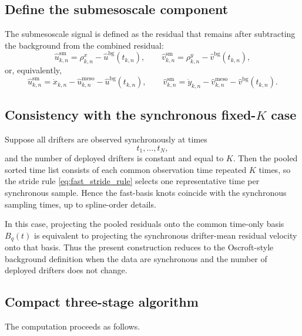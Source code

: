 \subsection{Define the submesoscale component}

The submesoscale signal is defined as the residual that remains after subtracting the
background from the combined residual:
\begin{equation}
\hat{u}^{\mathrm{sm}}_{k,n}
=
\rho^x_{k,n}-\hat{u}^{\mathrm{bg}}(t_{k,n}),
\qquad
\hat{v}^{\mathrm{sm}}_{k,n}
=
\rho^y_{k,n}-\hat{v}^{\mathrm{bg}}(t_{k,n}),
\label{eq:submeso_final}
\end{equation}
or, equivalently,
\begin{equation}
\hat{u}^{\mathrm{sm}}_{k,n}
=
\dot{x}_{k,n}
-\hat{u}^{\mathrm{meso}}_{k,n}
-\hat{u}^{\mathrm{bg}}(t_{k,n}),
\qquad
\hat{v}^{\mathrm{sm}}_{k,n}
=
\dot{y}_{k,n}
-\hat{v}^{\mathrm{meso}}_{k,n}
-\hat{v}^{\mathrm{bg}}(t_{k,n}).
\end{equation}

\subsection{Consistency with the synchronous fixed-$K$ case}

Suppose all drifters are observed synchronously at times
\begin{equation}
t_1,\dots,t_N,
\end{equation}
and the number of deployed drifters is constant and equal to $K$. Then the pooled sorted
time list consists of each common observation time repeated $K$ times, so the stride rule
\eqref{eq:fast_stride_rule} selects one representative time per synchronous sample. Hence the
fast-basis knots coincide with the synchronous sampling times, up to spline-order details.

In this case, projecting the pooled residuals onto the common time-only basis $B_q(t)$ is
equivalent to projecting the synchronous drifter-mean residual velocity onto that basis.
Thus the present construction reduces to the Oscroft-style background definition when the data
are synchronous and the number of deployed drifters does not change.

\subsection{Compact three-stage algorithm}

The computation proceeds as follows.

